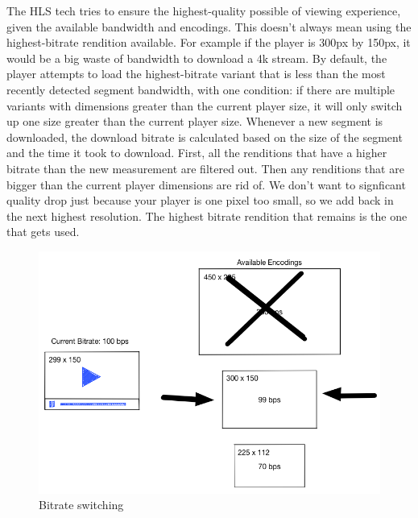 The HLS tech tries to ensure the highest-quality possible of viewing experience, given the available bandwidth and encodings. This doesn't always mean using the highest-bitrate rendition available. For example if the player is 300px by 150px, it would be a big waste of bandwidth to download a 4k stream. By default, the player attempts to load the highest-bitrate variant that is less than the most recently detected segment bandwidth, with one condition: if there are multiple variants with dimensions greater than the current player size, it will only switch up one size greater than the current player size.
Whenever a new segment is downloaded, the download bitrate is calculated based on the size of the segment and the time it took to download.
First, all the renditions that have a higher bitrate than the new measurement are filtered out.
Then any renditions that are bigger than the current player dimensions are rid of.
We don't want to signficant quality drop just because your player is one pixel too small, so we add back in the next highest resolution. The highest bitrate rendition that remains is the one that gets used.\cite{videojs_asb}


\begin{figure}[htb] %
 \centering
 \includegraphics[width=1.0\linewidth]{images/chapter2/bitrate-switching-4.png}\hfill
 \caption[Bitrate switching]{Bitrate switching}
 \label{fig:fourV}
\end{figure}



\newpage